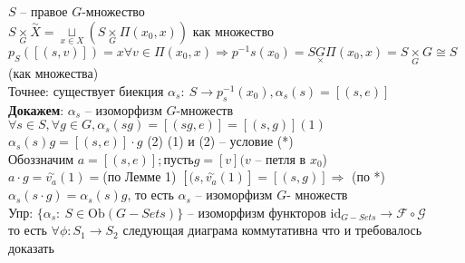 	$S$ -- правое $G$-множество\\
	$S \underset{G}{\times} \overset{\sim}{X} = \underset{x\in X}{\sqcup} (S \underset{G}{\times} \Pi (x_0,x))$ как множество\\
	$p_S ([(s,v)]) = x \forall v\in \Pi (x_0,x) \Rightarrow p^{-1} s(x_0) = S \underset{\times}{G} \Pi (x_0, x) = S \underset{G}{\times} G \cong S$ (как множества)\\
	Точнее: существует биекция ${\alpha}_s:\ S\rightarrow p_s^{-1} (x_0), {\alpha}_s (s) = [(s,e)]$\\
	\textbf{Докажем}: ${\alpha}_s$ -- изоморфизм $G$-множеств\\
	$\forall s\in S, \forall g\in G, {\alpha}_s (sg) = [(sg,e)] = [(s,g)] (1)$\\ 
	${\alpha}_s (s) g = [(s,e)] \cdot g$ (2)
	(1) и (2) -- условие (*)\\
	Обоззначим $a = [(s,e)]; пусть g = [v] (v$ -- петля в $x_0$)\\
	$a\cdot g = \overset{\sim}{v_a} (1) = $(по Лемме 1) $[(s,\overset{\sim}{v_a} (1)] = [(s,g)] \Rightarrow$ (по *) ${\alpha}_s (s\cdot g) = {\alpha}_s (s) g$, то есть ${\alpha}_s$ -- изоморфизм $G$- множеств\\
	Упр: $\{ {\alpha}_s:\ S\in \text{Ob}(G-Sets)\}$ -- изоморфизм функторов $ \text{id}_{G-Sets} \rightarrow \mathcal{F} \circ \mathscr{G}$\\
	то есть $\forall \phi: S_1 \rightarrow S_2$ следующая диаграма коммутативна что и требовалось доказать\\
	\begin{figure}[h]
	\end{figure}\\
	


\newpage
